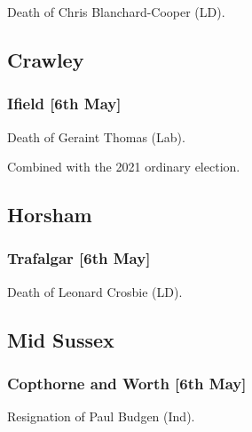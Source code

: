 \documentclass[a4paper,openany]{book}
\begin{document}
\begin{resultsiii}

Death of Chris Blanchard-Cooper (LD).

\subsection*{Crawley}

\subsubsection*{Ifield \hspace*{\fill}\nolinebreak[1]%
	\enspace\hspace*{\fill}
	[6th May]}


Death of Geraint Thomas (Lab).

Combined with the 2021 ordinary election.

\subsection*{Horsham}

\subsubsection*{Trafalgar \hspace*{\fill}\nolinebreak[1]%
	\enspace\hspace*{\fill}
	[6th May]}


Death of Leonard Crosbie (LD).

\subsection*{Mid Sussex}

\subsubsection*{Copthorne and Worth \hspace*{\fill}\nolinebreak[1]%
	\enspace\hspace*{\fill}
	[6th May]}


Resignation of Paul Budgen (Ind).


\end{resultsiii}
\end{document}
